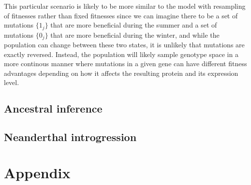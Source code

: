\documentclass{article}
\begin{document}
This particular scenario is likely to be more similar to the model with resampling of fitnesses rather than fixed fitnesses since we can imagine there to be a set of mutations $\{1_j\}$ that are more beneficial during the summer and a set of mutations $\{0_j\}$ that are more beneficial during the winter, and while the population can change between these two states, it is unlikely that mutations are exactly reversed. Instead, the population will likely sample genotype space in a more continous manner where mutations in a given gene can have different fitness advantages depending on how it affects the resulting protein and its expression level.


\subsection{Ancestral inference}

\subsection{Neanderthal introgression}



\newpage

\section*{Appendix}


\end{document}
